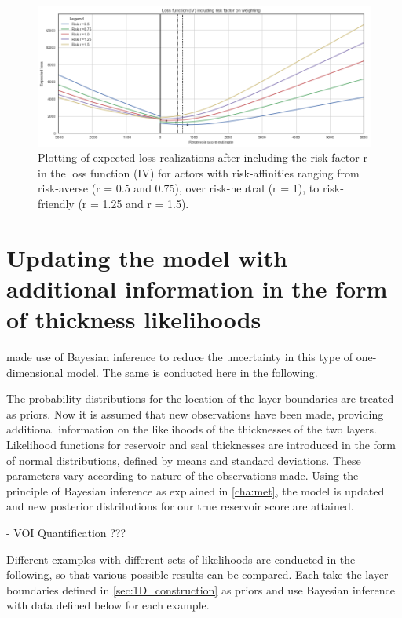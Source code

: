 	\begin{figure}[h]
		\centering
		\includegraphics[width=1\textwidth]{Figures/LFR.png}
		\caption{Plotting of expected loss realizations after including the risk factor r in the loss function (IV) for actors with risk-affinities ranging from risk-averse (r = 0.5 and 0.75), over risk-neutral (r = 1), to risk-friendly (r = 1.25 and r = 1.5).}\label{fig:LFR} 
	\end{figure}
	
	\section{Updating the model with additional information in the form of thickness likelihoods}
	
	\citet{delaVarga2016} made use of Bayesian inference to reduce the uncertainty in this type of one-dimensional model. The same is conducted here in the following.
	
	The probability distributions for the location of the layer boundaries are treated as priors. Now it is assumed that new observations have been made, providing additional information on the likelihoods of the thicknesses of the two layers. Likelihood functions for reservoir and seal thicknesses are introduced in the form of normal distributions, defined by means and standard deviations. These parameters vary according to nature of the observations made. Using the principle of Bayesian inference as explained in \ref{cha:met}, the model is updated and new posterior distributions for our true reservoir score are attained.
	
	- VOI Quantification ???
	
	Different examples with different sets of likelihoods are conducted in the following, so that various possible results can be compared. Each take the layer boundaries defined in  \ref{sec:1D_construction} as priors and use Bayesian inference with data defined below for each example.
	
